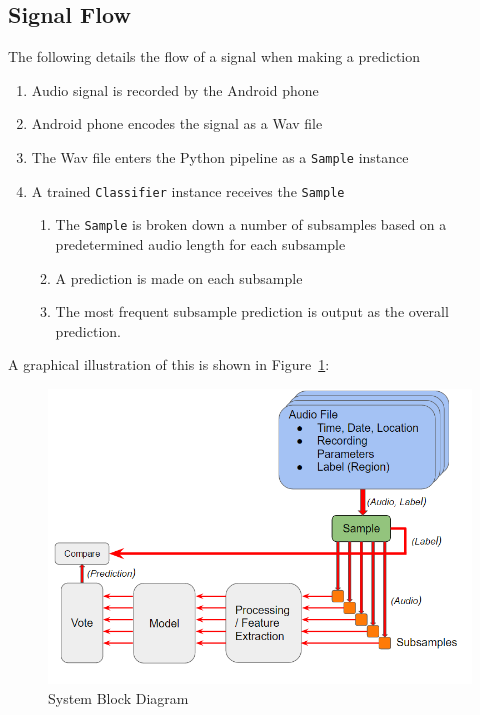 \documentclass[journal]{IEEEtran}
\begin{document}
\subsection{Signal Flow}\label{Signal Flow}
The following details the flow of a signal when making a prediction
\begin{enumerate}
\item Audio signal is recorded by the Android phone
\item Android phone encodes the signal as a Wav file
\item The Wav file enters the Python pipeline as a \texttt{Sample} instance
\item A trained \texttt{Classifier} instance receives the \texttt{Sample}
\begin{enumerate}
\item The \texttt{Sample} is broken down a number of subsamples based on a predetermined audio length for each subsample
\item A prediction is made on each subsample
\item The most frequent subsample prediction is output as the overall prediction.
\end{enumerate}
\end{enumerate}
A graphical illustration of this is shown in Figure~\ref{fig:bd}:\\
\begin{figure}[H]
\centering
\includegraphics[width=0.9\linewidth]{pred_flow}
\caption{System Block Diagram}
\label{fig:bd}
\end{figure}
\end{document}
